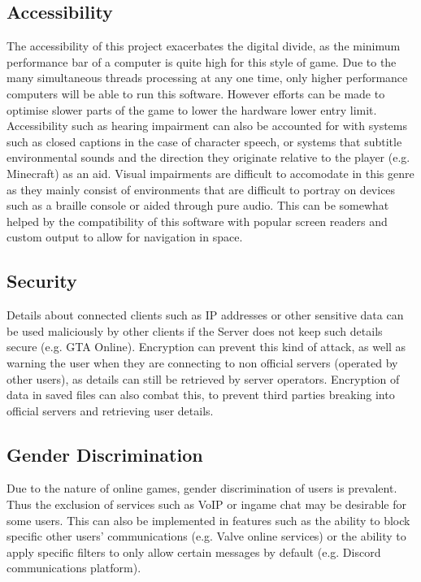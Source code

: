 \documentclass[12pt, DIV=calc]{scrartcl}
\begin{document}
\subsection{Accessibility}
The accessibility of this project exacerbates the digital divide, as the minimum performance bar of a computer is quite high for this style of game. Due to the many simultaneous threads processing at any one time, only higher performance computers will be able to run this software. However efforts can be made to optimise slower parts of the game to lower the hardware lower entry limit. \\

\noindent Accessibility such as hearing impairment can also be accounted for with systems such as closed captions in the case of character speech, or systems that subtitle environmental sounds and the direction they originate relative to the player (e.g. Minecraft) as an aid. Visual impairments are difficult to accomodate in this genre as they mainly consist of environments that are difficult to portray on devices such as a braille console or aided through pure audio. This can be somewhat helped by the compatibility of this software with popular screen readers and custom output to allow for navigation in space.  

\subsection{Security}
Details about connected clients such as IP addresses or other sensitive data can be used maliciously by other clients if the Server does not keep such details secure (e.g. GTA Online). Encryption can prevent this kind of attack, as well as warning the user when they are connecting to non official servers (operated by other users), as details can still be retrieved by server operators. Encryption of data in saved files can also combat this, to prevent third parties breaking into official servers and retrieving user details. 

\subsection{Gender Discrimination}
Due to the nature of online games, gender discrimination of users is prevalent. Thus the exclusion of services such as VoIP or ingame chat may be desirable for some users. This can also be implemented in features such as the ability to block specific other users' communications (e.g. Valve online services) or the ability to apply specific filters to only allow certain messages by default (e.g. Discord communications platform). 
\end{document}
